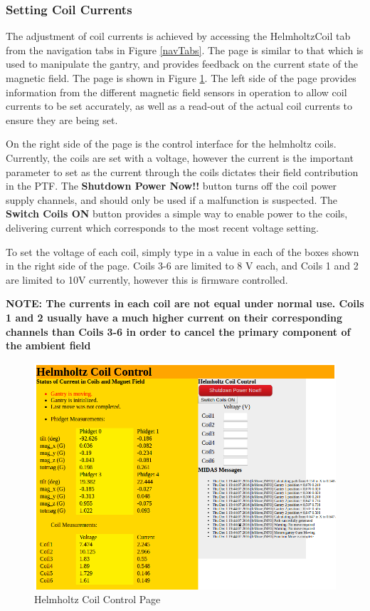 \documentclass[twoside,letterpaper]{refart}
\begin{document}
\subsubsection{Setting Coil Currents} \label{setCoils}

The adjustment of coil currents is achieved by accessing the HelmholtzCoil tab from the navigation tabs in Figure \ref{navTabs}. The page is similar to that which is used to manipulate the gantry, and provides feedback on the current state of the magnetic field.  The page is shown in Figure \ref{helmCoil}. The left side of the page provides information from the different magnetic field sensors in operation to allow coil currents to be set accurately, as well as a read-out of the actual coil currents to ensure they are being set. 

On the right side of the page is the control interface for the helmholtz coils.  Currently, the coils are set with a voltage, however the current is the important parameter to set as the current through the coils dictates their field contribution in the PTF.  The \textbf{Shutdown Power Now!!} button turns off the coil power supply channels, and should only be used if a malfunction is suspected.  The \textbf{Switch Coils ON} button provides a simple way to enable power to the coils, delivering current which corresponds to the most recent voltage setting.  

To set the voltage of each coil, simply type in a value in each of the boxes shown in the right side of the page.  Coils 3-6 are limited to 8 V each, and Coils 1 and 2 are limited to 10V currently, however this is firmware controlled.  

\textbf{NOTE:  The currents in each coil are not equal under normal use.  Coils 1 and 2 usually have a much higher current on their corresponding channels than Coils 3-6 in order to cancel the primary component of the ambient field}

\FloatBarrier

\begin{figure}[!htpb] 
	\centering	
	\includegraphics[scale=0.27]{images/helmCoil}
	\caption{Helmholtz Coil Control Page}
	\label{helmCoil}
\end{figure}
\end{document}
